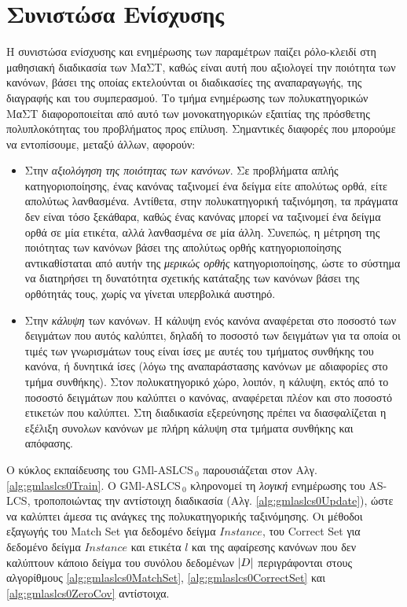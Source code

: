\section{Συνιστώσα Ενίσχυσης}
\label{sec:multiLabelUpdate}
Η συνιστώσα ενίσχυσης και ενημέρωσης των παραμέτρων παίζει ρόλο-κλειδί στη μαθησιακή διαδικασία των ΜαΣΤ, καθώς είναι αυτή που αξιολογεί την ποιότητα των κανόνων, βάσει της οποίας εκτελούνται οι διαδικασίες της αναπαραγωγής, της διαγραφής και του συμπερασμού. Το τμήμα ενημέρωσης των πολυκατηγορικών ΜαΣΤ διαφοροποιείται από αυτό των μονοκατηγορικών εξαιτίας της πρόσθετης πολυπλοκότητας του προβλήματος προς επίλυση. Σημαντικές διαφορές που μπορούμε να εντοπίσουμε, μεταξύ άλλων, αφορούν:

\begin{itemize}
\item Στην \textit{αξιολόγηση της ποιότητας των κανόνων}. Σε προβλήματα απλής κατηγοριοποίησης, ένας κανόνας ταξινομεί ένα δείγμα είτε απολύτως ορθά, είτε απολύτως λανθασμένα. Αντίθετα, στην πολυκατηγορική ταξινόμηση, τα πράγματα δεν είναι τόσο ξεκάθαρα, καθώς ένας κανόνας μπορεί να ταξινομεί ένα δείγμα ορθά σε μία ετικέτα, αλλά λανθασμένα σε μία άλλη. Συνεπώς, η μέτρηση της ποιότητας των κανόνων βάσει της απολύτως ορθής κατηγοριοποίησης αντικαθίσταται από αυτήν της \emph{μερικώς ορθής} κατηγοριοποίησης, ώστε το σύστημα να διατηρήσει τη δυνατότητα σχετικής κατάταξης των κανόνων βάσει της ορθότητάς τους, χωρίς να γίνεται υπερβολικά αυστηρό.

\item Στην \textit{κάλυψη} των κανόνων. Η κάλυψη ενός κανόνα αναφέρεται στο ποσοστό των δειγμάτων που αυτός καλύπτει, δηλαδή το ποσοστό των δειγμάτων για τα οποία οι τιμές των γνωρισμάτων τους είναι ίσες με αυτές του τμήματος συνθήκης του κανόνα, ή δυνητικά ίσες (λόγω της αναπαράστασης κανόνων με αδιαφορίες στο τμήμα συνθήκης). Στον πολυκατηγορικό χώρο, λοιπόν, η κάλυψη, εκτός από το ποσοστό δειγμάτων που καλύπτει ο κανόνας, αναφέρεται πλέον και στο ποσοστό ετικετών που καλύπτει. Στη διαδικασία εξερεύνησης πρέπει να διασφαλίζεται η εξέλιξη συνολων κανόνων με πλήρη κάλυψη στα τμήματα συνθήκης και απόφασης.
\end{itemize}
 

Ο κύκλος εκπαίδευσης του GMl-ASLCS$_{\:0}$ παρουσιάζεται στον Αλγ. \ref{alg:gmlaslcs0Train}. Ο GMl-ASLCS$_{\:0}$ κληρονομεί τη \emph{λογική} ενημέρωσης του AS-LCS, τροποποιώντας την αντίστοιχη διαδικασία (Αλγ. \ref{alg:gmlaslcs0Update}), ώστε να καλύπτει άμεσα τις ανάγκες της πολυκατηγορικής ταξινόμησης. Οι μέθοδοι εξαγωγής του Match Set για δεδομένο δείγμα $Instance$, του Correct Set για δεδομένο δείγμα $Instance$ και ετικέτα $l$ και της αφαίρεσης κανόνων που δεν καλύπτουν κάποιο δείγμα του συνόλου δεδομένων $\lvert D\rvert$ περιγράφονται στους αλγορίθμους \ref{alg:gmlaslcs0MatchSet}, \ref{alg:gmlaslcs0CorrectSet} και \ref{alg:gmlaslcs0ZeroCov} αντίστοιχα.


